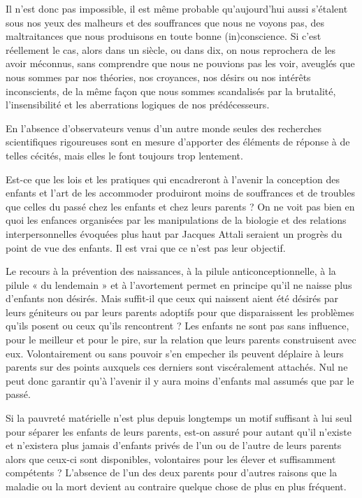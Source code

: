  Il n'est donc pas impossible, il est même probable qu'aujourd'hui aussi s'étalent sous nos yeux des malheurs et des souffrances que nous ne voyons pas, des maltraitances que nous produisons en toute bonne (in)conscience. Si c'est réellement le cas, alors dans un siècle, ou dans dix, on nous reprochera de les avoir méconnus, sans comprendre que nous ne pouvions pas les voir, aveuglés que nous sommes par nos théories, nos croyances, nos désirs ou nos intérêts inconscients, de la même façon que nous sommes scandalisés par la brutalité, l'insensibilité et les aberrations logiques de nos prédécesseurs. 
 
 En l'absence d'observateurs venus d'un autre monde seules des recherches scientifiques rigoureuses sont en mesure d'apporter des éléments de réponse à de telles cécités, mais elles le font toujours trop lentement.


 
 
 Est-ce que les lois et les pratiques qui encadreront à l'avenir la conception des enfants et l'art de les accommoder produiront moins de souffrances et de troubles que celles du passé chez les enfants et chez leurs parents ? On ne voit pas bien en quoi les enfances organisées par les manipulations de la biologie et des relations interpersonnelles évoquées plus haut par Jacques Attali seraient un progrès du point de vue des enfants. Il est vrai que ce n'est pas leur objectif. 

 Le recours à la prévention des naissances, à la pilule anticonceptionnelle, à la pilule « du lendemain » et à l'avortement permet en principe qu'il ne naisse plus d'enfants non désirés. Mais suffit-il que ceux qui naissent aient été désirés par leurs géniteurs ou par leurs parents adoptifs pour que disparaissent les problèmes qu'ils posent ou ceux qu'ils rencontrent ? Les enfants ne sont pas sans influence, pour le meilleur et pour le pire, sur la relation que leurs parents construisent avec eux. Volontairement ou sans pouvoir s'en empecher ils peuvent déplaire à leurs parents sur des points auxquels ces derniers sont viscéralement attachés. Nul ne peut donc garantir qu'à l'avenir il y aura moins d'enfants mal assumés que par le passé. 

 Si la pauvreté matérielle n'est plus depuis longtemps un motif suffisant à lui seul pour séparer les enfants de leurs parents, est-on assuré pour autant qu'il n'existe et n'existera plus jamais d'enfants privés de l'un ou de l'autre de leurs parents alors que ceux-ci sont disponibles, volontaires pour les élever et suffisamment compétents ? L'absence de l'un des deux parents pour d'autres raisons que la maladie ou la mort devient au contraire quelque chose de plus en plus fréquent. 

